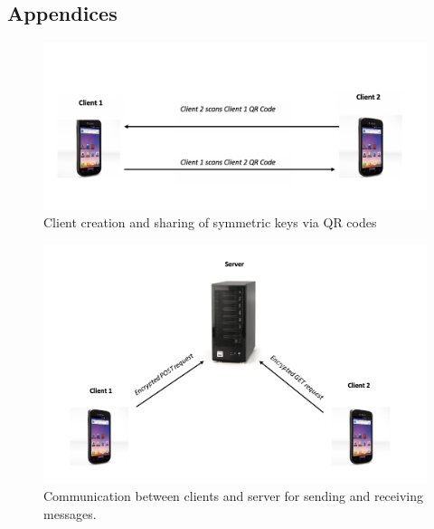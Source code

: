 \documentclass[11pt]{article}
\begin{document}
\subsection{Appendices}
\begin{figure}[h!]
  \centerline{\includegraphics[width=\linewidth]{cc.png}}
  \caption{Client creation and sharing of symmetric keys via QR codes}
  \label{fig:client_client}
\end{figure}

\begin{figure}[h!]
  \centerline{\includegraphics[width=\linewidth]{cs.png}}
  \caption{Communication between clients and server for sending and receiving messages.}
  \label{fig:client_client}
\end{figure}
\end{document}
